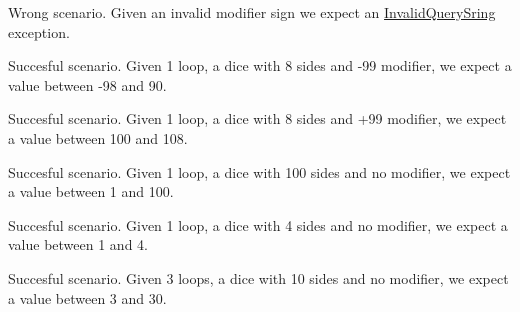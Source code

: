\begin{DoxyRefList}
\item[\label{test__test000010}%
\hypertarget{test__test000010}{}%
Member \hyperlink{class_test_dice_a4bc687597fc6bcf0d7bbc184c9250c56}{Test\+Dice\+:\+:test\+Invalid\+Query\+Sign} (void)]Wrong scenario. Given an invalid modifier sign we expect an \hyperlink{struct_invalid_query_sring}{Invalid\+Query\+Sring} exception.  
\item[\label{test__test000005}%
\hypertarget{test__test000005}{}%
Member \hyperlink{class_test_dice_a4abec357f77e11c1bf199efc0863ffeb}{Test\+Dice\+:\+:test\+Roll\+Modifier\+Negative} (void)]Succesful scenario. Given 1 loop, a dice with 8 sides and -\/99 modifier, we expect a value between -\/98 and 90.  
\item[\label{test__test000004}%
\hypertarget{test__test000004}{}%
Member \hyperlink{class_test_dice_a0e72b077dd7809a8477f769ee6183232}{Test\+Dice\+:\+:test\+Roll\+Modifier\+Positive} (void)]Succesful scenario. Given 1 loop, a dice with 8 sides and +99 modifier, we expect a value between 100 and 108.  
\item[\label{test__test000002}%
\hypertarget{test__test000002}{}%
Member \hyperlink{class_test_dice_a6117f3360b40fadea30354440019948a}{Test\+Dice\+:\+:test\+Roll\+Sides100} (void)]Succesful scenario. Given 1 loop, a dice with 100 sides and no modifier, we expect a value between 1 and 100.  
\item[\label{test__test000001}%
\hypertarget{test__test000001}{}%
Member \hyperlink{class_test_dice_ae621d5b78bffd9b5a52cce4d9177aa2f}{Test\+Dice\+:\+:test\+Roll\+Sides4} (void)]Succesful scenario. Given 1 loop, a dice with 4 sides and no modifier, we expect a value between 1 and 4.  
\item[\label{test__test000003}%
\hypertarget{test__test000003}{}%
Member \hyperlink{class_test_dice_ab54f699e2f2d4f00356ff8e7fb70cff2}{Test\+Dice\+:\+:test\+Roll\+Sides\+Loops} (void)]Succesful scenario. Given 3 loops, a dice with 10 sides and no modifier, we expect a value between 3 and 30. 
\end{DoxyRefList}